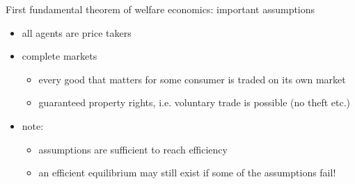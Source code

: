 \documentclass[bigger]{beamer}
\begin{document}
\begin{frame}[label={sec:orgdeff8d5}]{First fundamental  theorem of welfare economics: important assumptions}
\begin{itemize}
\item all agents are price takers
\item complete markets
\begin{itemize}
\item every good that matters for some consumer is traded on its own market
\item guaranteed property rights, i.e. voluntary trade is possible (no theft etc.)
\end{itemize}
\item note:
\begin{itemize}
\item assumptions are sufficient to reach efficiency
\item an efficient equilibrium may still exist if some of the assumptions fail!
\end{itemize}
\end{itemize}
\end{frame}
\end{document}

